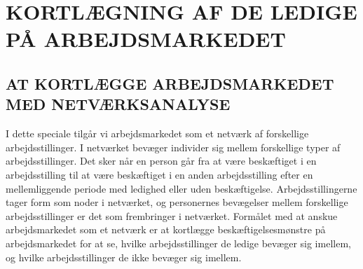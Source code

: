 



\chapter{KORTLÆGNING AF DE LEDIGE PÅ ARBEJDSMARKEDET} \label{metode}











\section{AT KORTLÆGGE ARBEJDSMARKEDET MED NETVÆRKSANALYSE \label{netvaerksanalyse}}

I dette speciale tilgår vi arbejdsmarkedet som et netværk af forskellige arbejdsstillinger. I netværket bevæger individer sig mellem forskellige typer af arbejdsstillinger. Det sker når en person går fra at være beskæftiget i en arbejdsstilling til at være beskæftiget i en anden arbejdsstilling efter en mellemliggende periode med ledighed eller uden beskæftigelse. Arbejdsstillingerne tager form som noder i netværket, og personernes bevægelser mellem forskellige arbejdsstillinger er det som frembringer  i netværket. Formålet med at anskue arbejdsmarkedet som et netværk er at kortlægge beskæftigelsesmønstre på arbejdsmarkedet for at se, hvilke arbejdsstillinger de ledige bevæger sig imellem, og hvilke arbejdsstillinger de ikke bevæger sig imellem.


